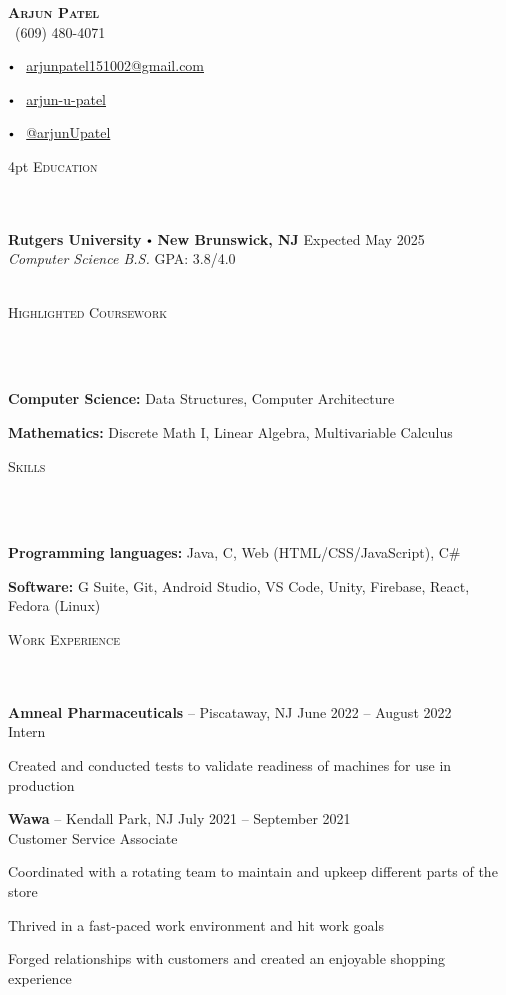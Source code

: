 \documentclass{article}
\newcommand{\contact}[3]{
\vspace*{3pt}
\begin{center}
{\LARGE \scshape {#1}}\\
\vspace{5pt}
#2 
\vspace{2pt}
#3
\end{center}
\vspace*{-8pt}
}
\newcommand{\header}[1]{{
\hspace*{0pt}\vspace*{6pt} \textsc{#1}} \vspace*{-6pt} 
\lineunder
}
\newcommand{\lineunder}{
\vspace*{-8pt} \\ \hspace*{-3pt} 
\hrulefill \\
}
\newcommand{\college}[7]{
\textbf{#1} \labelitemi \textbf{#2} \hfill #3 \\ #4 \hfill #7 \\ #5 \\ #6 \vspace*{5pt}
}
\newcommand{\employer}[4]{{
\vspace*{2pt}%
\textbf{#1} #2 \hfill #3\\ #4 \vspace*{2pt}}
}
\renewcommand{\labelitemi}{
$\vcenter{\hbox{\tiny$\bullet$}}$\hspace*{3pt}
}
\renewcommand{\labelitemii}{
$\vcenter{\hbox{\tiny$\bullet$}}$\hspace*{-3pt}
}
\newenvironment{bullet-list-major}{
\begin{list}{\labelitemii}{\setlength\leftmargin{9pt} 
\topsep 0pt \itemsep -2pt}}{\vspace*{4pt}\end{list}
}
\newenvironment{bullet-list-minor}{
\begin{list}{\labelitemii}{\setlength\leftmargin{15pt} 
\topsep 0pt \itemsep -2pt}}{\vspace*{4pt}\end{list}
}
\begin{document}
\small
\smallskip
\vspace*{-20pt}

\contact{\textbf{Arjun Patel}}
{\faPhone\ (609) 480-4071
\labelitemi \faEnvelope\ \href{mailto:arjunpatel151002@gmail.com}{arjunpatel151002@gmail.com}
\labelitemi \faLinkedin\ \href{https://www.linkedin.com/in/arjun-u-patel/}{arjun-u-patel}
\labelitemi \faGithub\ \href{https://github.com/arjunupatel}{@arjunUpatel}%
}

\vspace{4pt}
\header{Education}
    \college{Rutgers University}{New Brunswick, NJ}{Expected May 2025}
    {\textit{Computer Science B.S.}}
    {}{}{GPA: 3.8/4.0}
    
\vspace*{4pt}%
\header{Highlighted Coursework}
    \begin{bullet-list-major}
    \item \textbf{Computer Science:} Data Structures, Computer Architecture
    \item \textbf{Mathematics:} Discrete Math I, Linear Algebra, Multivariable Calculus
    \end{bullet-list-major}

\vspace*{4pt}%
\header{Skills}
    \begin{bullet-list-major}
    \item \textbf{Programming languages:} Java, C, Web (HTML/CSS/JavaScript), C\#
    \item \textbf{Software:} G Suite, Git, Android Studio, VS Code, Unity, Firebase, React, Fedora (Linux)
    \end{bullet-list-major}
    
\vspace*{4pt}%
\header{Work Experience}

    \employer{Amneal Pharmaceuticals}
    {-- Piscataway, NJ}{June 2022 -- August 2022}{Intern}
	\begin{bullet-list-minor}
    \item Created and conducted tests to validate readiness of machines for use in production
    \item 
    \end{bullet-list-minor}
    
    \employer{Wawa}
    {-- Kendall Park, NJ}{July 2021 -- September 2021}{Customer Service Associate}
	\begin{bullet-list-minor}
	\item Coordinated with a rotating team to maintain and upkeep different parts of the store
    \item Thrived in a fast-paced work environment and hit work goals
    \item Forged relationships with customers and created an enjoyable shopping experience
    \end{bullet-list-minor}
    
\end{document}
